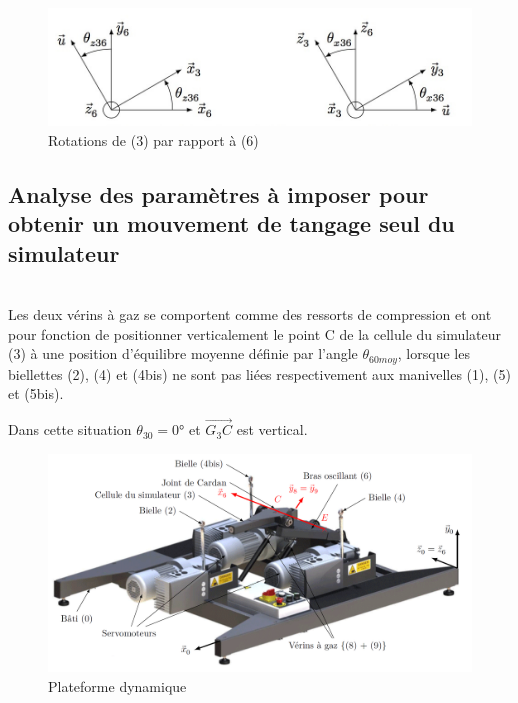 \begin{figure}[!h]
 \centering\includegraphics[width=0.7\linewidth]{img/figure_8}
 \caption{Rotations de (3) par rapport à (6)}
 \label{img08}
\end{figure}

\subsection{Analyse des paramètres à imposer pour obtenir un mouvement de tangage seul du simulateur}


 ~\ \\

Les deux vérins à gaz se comportent comme des ressorts de compression et ont pour fonction de positionner
verticalement le point C de la cellule du simulateur (3) à une position d'équilibre moyenne définie par l'angle
$\theta_{60moy}$, lorsque les biellettes (2), (4) et (4bis) ne sont pas liées respectivement aux manivelles (1), (5) et (5bis).

Dans cette situation $\theta_{30}=0°$ et $\overrightarrow{G_3C}$ est vertical.

\begin{figure}[!h]
 \centering\includegraphics[width=0.8\linewidth]{img/figure_A}
 \caption{Plateforme dynamique}
 \label{imgA}
\end{figure}

